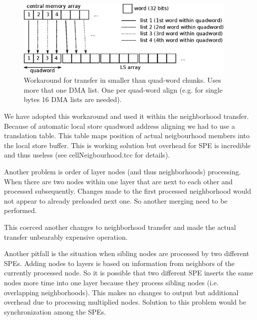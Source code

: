 \begin{figure}
    \centering
    \includegraphics[width=0.95\textwidth]{data/multipleDMAList}
    \caption[Multiple DMA list workaround]
{
  Workaround for transfer in smaller than quad-word chunks.
  Uses more that one DMA list.
  One per quad-word align (e.g. for single bytes 16 DMA lists are needed).
}
    \label{fg:multipleDMAList}
\end{figure}

We have adopted this workaround and used it within the neighborhood transfer.
Because of automatic local store quadword address aligning we had to use a translation table.
This table maps position of actual neigbourhood members into the local store buffer.
This is working solution but overhead for SPE is incredible and thus useless (see cellNeigbourhood.tcc for details).

\par
\label{neighbourhoodDependecy}
Another problem is order of layer nodes (and thus neighborhoods) processing.
When there are two nodes within one layer that are next to each other and processed subsequently.
Changes made to the first processed neighborhood would not appear to already preloaded next one.
So another merging need to be performed.

\par
This coerced another changes to neighborhood transfer and made the actual transfer unbearably expensive operation.

\par
\label{workDependecy}
Another pitfall is the situation when sibling nodes are processed by two different SPEs.
Adding nodes to layers is based on information from neighbors of the currently processed node.
So it is possible that two different SPE inserts the same nodes more time into one layer because they process sibling nodes (i.e. overlapping neighborhoods).
This makes no changes to output but additional overhead due to processing multiplied nodes.
Solution to this problem would be synchronization among the SPEs.

